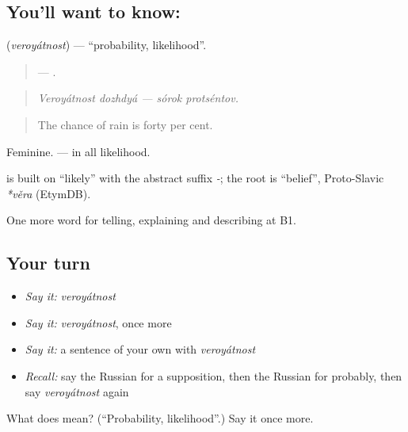 \subsection*{You'll want to know: }
\textbf{} (\emph{veroyátnost}) — \textquotedblleft{}probability, likelihood\textquotedblright{}.

\begin{quote}
  —  .
\end{quote}

\begin{quote}
\emph{Veroyátnost dozhdyá — sórok protséntov.}
\end{quote}

\begin{quote}
The chance of rain is forty per cent.
\end{quote}

Feminine. \emph{  } — in all likelihood.

\begin{cousinweb}
\textbf{} is built on \emph{} \textquotedblleft{}likely\textquotedblright{} with the abstract suffix \emph{-}; the root is \emph{} \textquotedblleft{}belief\textquotedblright{}, Proto-Slavic \emph{*věra} (EtymDB).
\end{cousinweb}

\begin{grammarlens}[title={What you've built}]
One more word for telling, explaining and describing at B1.
\end{grammarlens}

\subsection*{Your turn}
\begin{itemize}
\raggedright
  \item \emph{Say it:} \emph{veroyátnost}
  \item \emph{Say it:} \emph{veroyátnost}, once more
  \item \emph{Say it:} a sentence of your own with \emph{veroyátnost}
  \item \emph{Recall:} say the Russian for a supposition, then the Russian for probably, then say \emph{veroyátnost} again
\end{itemize}

\begin{tcolorbox}[breakable,colback=teal!4,colframe=teal!35!black,title={Before you move on}]
What does  mean? (\textquotedblleft{}Probability, likelihood\textquotedblright{}.) Say it once more.
\end{tcolorbox}
